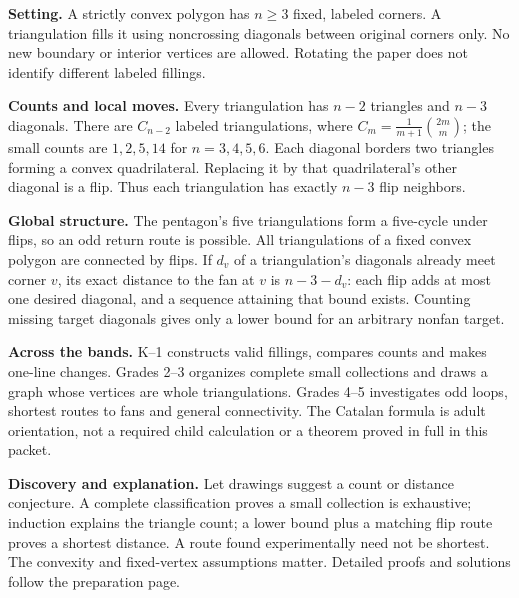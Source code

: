 \textbf{Setting.} A strictly convex polygon has $n\geq3$ fixed, labeled corners. A triangulation fills it using noncrossing diagonals between original corners only. No new boundary or interior vertices are allowed. Rotating the paper does not identify different labeled fillings.

\textbf{Counts and local moves.} Every triangulation has $n-2$ triangles and $n-3$ diagonals. There are $C_{n-2}$ labeled triangulations, where $C_m=\frac{1}{m+1}\binom{2m}{m}$; the small counts are $1,2,5,14$ for $n=3,4,5,6$. Each diagonal borders two triangles forming a convex quadrilateral. Replacing it by that quadrilateral's other diagonal is a flip. Thus each triangulation has exactly $n-3$ flip neighbors.

\textbf{Global structure.} The pentagon's five triangulations form a five-cycle under flips, so an odd return route is possible. All triangulations of a fixed convex polygon are connected by flips. If $d_v$ of a triangulation's diagonals already meet corner $v$, its exact distance to the fan at $v$ is $n-3-d_v$: each flip adds at most one desired diagonal, and a sequence attaining that bound exists. Counting missing target diagonals gives only a lower bound for an arbitrary nonfan target.

\textbf{Across the bands.} K--1 constructs valid fillings, compares counts and makes one-line changes. Grades 2--3 organizes complete small collections and draws a graph whose vertices are whole triangulations. Grades 4--5 investigates odd loops, shortest routes to fans and general connectivity. The Catalan formula is adult orientation, not a required child calculation or a theorem proved in full in this packet.

\textbf{Discovery and explanation.} Let drawings suggest a count or distance conjecture. A complete classification proves a small collection is exhaustive; induction explains the triangle count; a lower bound plus a matching flip route proves a shortest distance. A route found experimentally need not be shortest. The convexity and fixed-vertex assumptions matter. Detailed proofs and solutions follow the preparation page.
